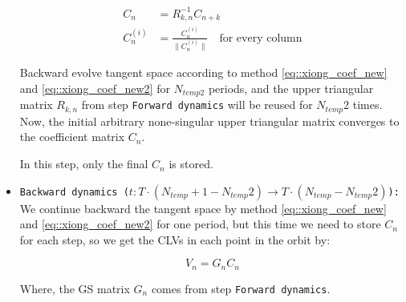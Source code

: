 \begin{itemize}
       \begin{align}
       C_{n} & =R_{k,n}^{-1}C_{n+k} \label{eq::xiong_coef_new2}\\
       C_{n}^{(i)} &=\frac{C_{n}^{(i)}}{\| C_{n}^{(i)} \|}\quad \text{for every column}
       \label{eq::xiong_coef_new}
      \end{align}


      Backward evolve tangent space according to method \eqref{eq::xiong_coef_new} and
      \eqref{eq::xiong_coef_new2} for
      $N_{temp2}$ periods, and the upper triangular
      matrix $R_{k,n}$ from step \texttt{Forward dynamics} will be reused for $N_{temp}2$
      times. Now, the initial arbitrary none-singular upper
      triangular matrix converges to the coefficient matrix $C_n$.

      In this step, only the final $C_n$ is stored.

      \item \texttt{Backward dynamics ($t:T \cdot (N_{temp}+1-N_{temp}2)\to T \cdot (N_{temp}-N_{temp}2)$):}
      We continue backward the tangent space by method \eqref{eq::xiong_coef_new} and
      \eqref{eq::xiong_coef_new2} for one period,
      but this time we need to store $C_n$ for each step, so we get the CLVs
      in each point in the orbit by:

      \begin{equation}
       V_{n}=G_{n}C_{n}
      \end{equation}

      Where, the GS matrix $G_{n}$ comes from step \texttt{Forward dynamics}.


    \end{itemize}
